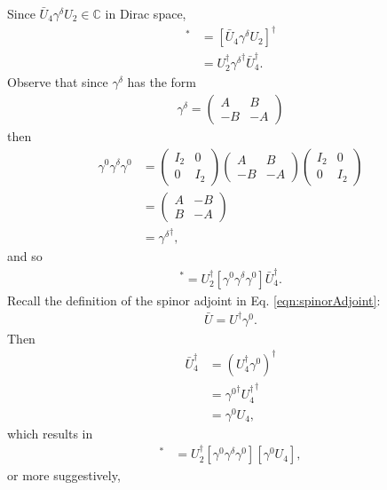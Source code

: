 Since $\bar{U}_4\gamma^\delta U_2 \in \mathbb{C}$ in Dirac space, 
\begin{align*}
[\bar{U}_4\gamma^\delta U_2]^*&=[\bar{U}_4\gamma^\delta U_2]^\dagger\\
&=U^\dagger _2 {\gamma^\delta}^\dagger \bar{U}_4 ^\dagger.
\end{align*}
Observe that since $\gamma^\delta$ has the form
\begin{align*}
\gamma^\delta=	\begin{pmatrix}
			A&B\\
			-B&-A
			\end{pmatrix}
\end{align*}
then
\begin{align*}
\gamma^0\gamma^\delta\gamma^0 &=	
	\begin{pmatrix}
	I_2 & 0\\
	0 & I_2
	\end{pmatrix}
	\begin{pmatrix}
	A&B\\
	-B&-A
	\end{pmatrix}
	\begin{pmatrix}
	I_2 & 0\\
	0 & I_2
	\end{pmatrix}
\\
&=	\begin{pmatrix}
	A&-B\\
	B&-A
	\end{pmatrix}
\\
&= {\gamma^\delta}^\dagger,
\end{align*}
and so
\begin{align*}
[\bar{U}_4\gamma^\delta U_2]^*=U^\dagger _2 [\gamma^0 \gamma^\delta \gamma^0] \bar{U}_4 ^\dagger.
\end{align*}
Recall the definition of the spinor adjoint in Eq. \eqref{eqn:spinorAdjoint}:
\begin{align*}
\bar{U}=U^\dagger \gamma^0.
\end{align*}
Then
\begin{align*}
\bar{U}_4 ^\dagger&=(U_4 ^\dagger \gamma^0)^\dagger\\
&={\gamma^0}^\dagger {U_4^\dagger}^\dagger\\
&=\gamma^0 U_4,
\end{align*}
which results in
\begin{align*}
[\bar{U}_4\gamma^\delta U_2]^*&=U^\dagger _2 [\gamma^0 \gamma^\delta \gamma^0] [\gamma^0 U_4],
\end{align*}
or more suggestively,
